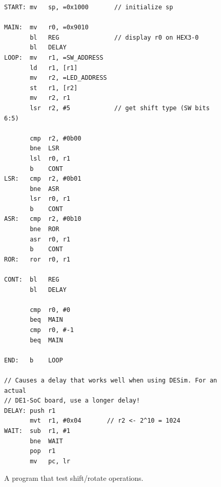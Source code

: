 \documentclass[epsfig,10pt,fullpage]{article} \addtolength{\textwidth}{1.5in}
\begin{document}
\begin{enumerate}
\begin{figure}[H]
\begin{center}
\begin{minipage}[h]{13 cm}
\begin{lstlisting}[name=proc]
START: mv   sp, =0x1000       // initialize sp

MAIN:  mv   r0, =0x9010
       bl   REG               // display r0 on HEX3-0
       bl   DELAY
LOOP:  mv   r1, =SW_ADDRESS
       ld   r1, [r1]
       mv   r2, =LED_ADDRESS
       st   r1, [r2]
       mv   r2, r1
       lsr  r2, #5            // get shift type (SW bits 6:5)

       cmp  r2, #0b00
       bne  LSR
       lsl  r0, r1
       b    CONT
LSR:   cmp  r2, #0b01
       bne  ASR
       lsr  r0, r1
       b    CONT
ASR:   cmp  r2, #0b10
       bne  ROR
       asr  r0, r1
       b    CONT
ROR:   ror  r0, r1

CONT:  bl   REG
       bl   DELAY

       cmp  r0, #0
       beq  MAIN
       cmp  r0, #-1
       beq  MAIN

END:   b    LOOP

// Causes a delay that works well when using DESim. For an actual 
// DE1-SoC board, use a longer delay!
DELAY: push r1
       mvt  r1, #0x04       // r2 <- 2^10 = 1024
WAIT:  sub  r1, #1
       bne  WAIT
       pop  r1
       mv   pc, lr
\end{lstlisting}
\end{minipage}
\caption{A program that test shift/rotate operations.}
\label{fig:shift_test}
\end{center}
\end{figure}

\end{enumerate}
\end{document}
